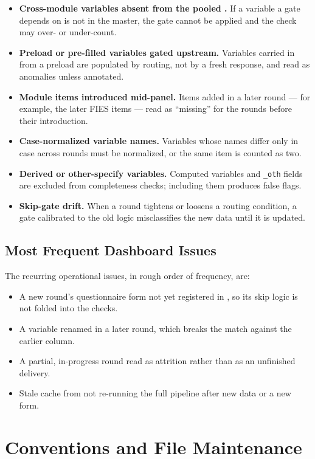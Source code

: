 \begin{itemize}
  \item \textbf{Cross-module variables absent from the pooled .} If a variable a gate depends on is not in the master, the gate cannot be applied and the check may over- or under-count.
  \item \textbf{Preload or pre-filled variables gated upstream.} Variables carried in from a preload are populated by routing, not by a fresh response, and read as anomalies unless annotated.
  \item \textbf{Module items introduced mid-panel.} Items added in a later round --- for example, the later FIES items --- read as ``missing'' for the rounds before their introduction.
  \item \textbf{Case-normalized variable names.} Variables whose names differ only in case across rounds must be normalized, or the same item is counted as two.
  \item \textbf{Derived or other-specify variables.} Computed variables and \texttt{\_oth} fields are excluded from completeness checks; including them produces false flags.
  \item \textbf{Skip-gate drift.} When a round tightens or loosens a routing condition, a gate calibrated to the old logic misclassifies the new data until it is updated.
\end{itemize}

\subsection{Most Frequent Dashboard Issues}

The recurring operational issues, in rough order of frequency, are:

\begin{itemize}
  \item A new round's questionnaire form not yet registered in , so its skip logic is not folded into the checks.
  \item A variable renamed in a later round, which breaks the match against the earlier column.
  \item A partial, in-progress round read as attrition rather than as an unfinished delivery.
  \item Stale cache from not re-running the full pipeline after new data or a new form.
\end{itemize}

\section{Conventions and File Maintenance}

